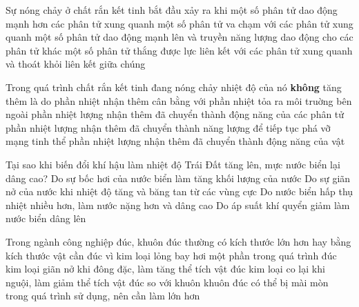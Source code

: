 \begin{ex} 
	Sự nóng chảy ở chất rắn kết tinh bắt đầu xảy ra khi
	\choice
	{một số phân tử dao động mạnh hơn các phân tử xung quanh}
	{một số phân tử va chạm với các phân tử xung quanh}
	{một số phân tử dao động mạnh lên và truyền năng lượng dao động cho các phân tử khác}
	{\True một số phân tử thắng được lực liên kết với các phân tử xung quanh và thoát khỏi liên kết giữa chúng}
\end{ex}

\begin{ex} 
	Trong quá trình chất rắn kết tinh đang nóng chảy nhiệt độ của nó \textbf{không} tăng thêm là do
	\choice
	{phần nhiệt nhận thêm cân bằng với phần nhiệt tỏa ra môi truờng bên ngoài}
	{phần nhiệt lượng nhận thêm đã chuyển thành động năng của các phân tử}
	{\True phần nhiệt lượng nhận thêm đã chuyển thành năng lượng để tiếp tục phá vỡ mạng tinh thể}
	{phần nhiệt lượng nhận thêm đã chuyển thành động năng của vật}
\end{ex}


\begin{ex} 
	Tại sao khi biến đổi khí hậu làm nhiệt độ Trái Đất tăng lên, mực nước biển lại dâng cao?
	\choice
	{Do sự bốc hơi của nước biển làm tăng khối lượng của nước}
	{\True Do sự giãn nở của nước khi nhiệt độ tăng và băng tan từ các vùng cực}
	{Do nước biển hấp thụ nhiệt nhiều hơn, làm nước nặng hơn và dâng cao}
	{Do áp suất khí quyển giảm làm nước biển dâng lên}
\end{ex}

\begin{ex} 
	Trong ngành công nghiệp đúc, khuôn đúc thường có kích thước lớn hơn hay bằng kích thước vật cần đúc vì
	\choice
	{kim loại lỏng bay hơi một phần trong quá trình đúc}
	{kim loại giãn nở khi đông đặc, làm tăng thể tích vật đúc}
	{\True kim loại co lại khi nguội, làm giảm thể tích vật đúc so với khuôn}
	{khuôn đúc có thể bị mài mòn trong quá trình sử dụng, nên cần làm lớn hơn}
\end{ex}

